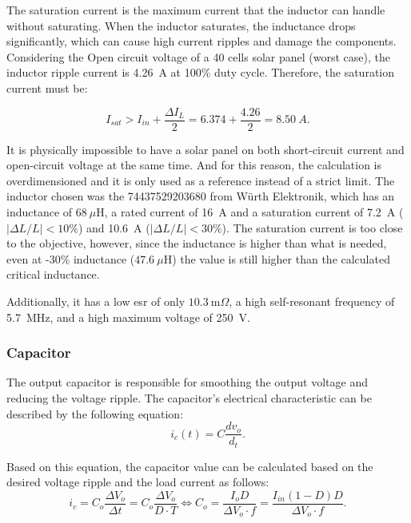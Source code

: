 The saturation current is the maximum current that the inductor can handle without saturating. When the inductor saturates, the inductance drops significantly, which can cause high current ripples and damage the components. Considering the Open circuit voltage of a 40 cells solar panel (worst case), the inductor ripple current is 4.26~A at 100\% duty cycle. Therefore, the saturation current must be:

\begin{equation}
    I_{sat} > I_{in} + \frac{\Delta I_L}{2} = 6.374 + \frac{4.26}{2} = 8.50~A .
\end{equation}

It is physically impossible to have a solar panel on both short-circuit current and open-circuit voltage at the same time. And for this reason, the calculation is overdimensioned and it is only used as a reference instead of a strict limit.
The inductor chosen was the 74437529203680 from Würth Elektronik, which has an inductance of $68~\mu\mathrm{H}$, a rated current of 16~A and a saturation current of 7.2~A ($|\Delta L/L|<10\%$) and 10.6~A ($|\Delta L/L|<30\%$). The saturation current is too close to the objective, however, since the inductance is higher than what is needed, even at -30\% inductance ($47.6~\mu\mathrm{H}$) the value is still higher than the calculated critical inductance. 

Additionally, it has a low \ac{esr} of only $10.3~\mathrm{m}\Omega$, a high self-resonant frequency of 5.7~MHz, and a high maximum voltage of 250~V.

\subsubsection{Capacitor}
    The output capacitor is responsible for smoothing the output voltage and reducing the voltage ripple. The capacitor's electrical characteristic can be described by the following equation:
    \begin{equation}
        i_c(t) = C \frac{dv_o}{d_t}.
    \end{equation}

    Based on this equation, the capacitor value can be calculated based on the desired voltage ripple and the load current as follows:
    \begin{equation}
        i_c = C_o  \frac{\Delta V_o}{\Delta t} = C_o \frac{\Delta V_o}{D \cdot T } \Leftrightarrow C_o = \frac{I_o D}{\Delta V_o \cdot f} = \frac{I_{in} (1-D)D}{\Delta V_o \cdot f}.
    \end{equation}

